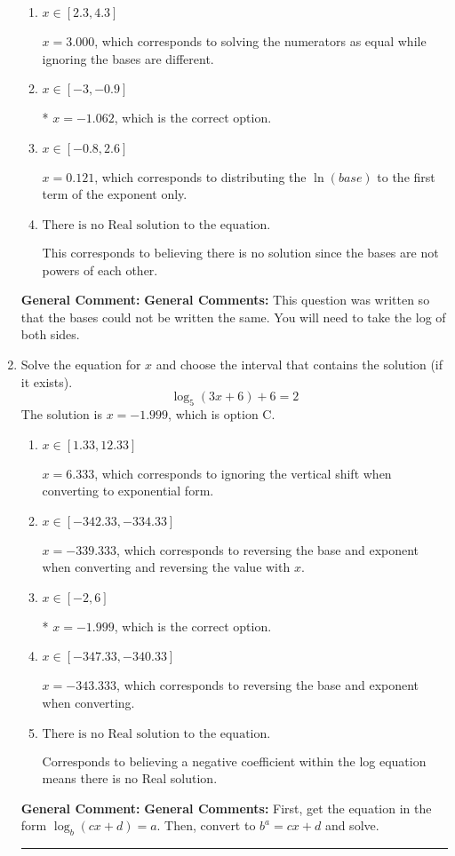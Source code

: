 \documentclass{extbook}[14pt]
\newcommand{\litem}[1]{\item #1

\rule{\textwidth}{0.4pt}}
\begin{document}
\begin{enumerate}
{\begin{enumerate}[label=\Alph*.]
$x = -26.339$, which corresponds to distributing the $\ln(base)$ to the second term of the exponent only.
\item \( x \in [2.3, 4.3] \)

$x = 3.000$, which corresponds to solving the numerators as equal while ignoring the bases are different.
\item \( x \in [-3, -0.9] \)

* $x = -1.062$, which is the correct option.
\item \( x \in [-0.8, 2.6] \)

$x = 0.121$, which corresponds to distributing the $\ln(base)$ to the first term of the exponent only.
\item \( \text{There is no Real solution to the equation.} \)

This corresponds to believing there is no solution since the bases are not powers of each other.
\end{enumerate}

\textbf{General Comment:} \textbf{General Comments:} This question was written so that the bases could not be written the same. You will need to take the log of both sides.
}
\litem{
Solve the equation for $x$ and choose the interval that contains the solution (if it exists).
\[ \log_{5}{(3x+6)}+6 = 2 \]The solution is \( x = -1.999 \), which is option C.\begin{enumerate}[label=\Alph*.]
\item \( x \in [1.33, 12.33] \)

$x = 6.333$, which corresponds to ignoring the vertical shift when converting to exponential form.
\item \( x \in [-342.33, -334.33] \)

$x = -339.333$, which corresponds to reversing the base and exponent when converting and reversing the value with $x$.
\item \( x \in [-2, 6] \)

* $x = -1.999$, which is the correct option.
\item \( x \in [-347.33, -340.33] \)

$x = -343.333$, which corresponds to reversing the base and exponent when converting.
\item \( \text{There is no Real solution to the equation.} \)

Corresponds to believing a negative coefficient within the log equation means there is no Real solution.
\end{enumerate}

\textbf{General Comment:} \textbf{General Comments:} First, get the equation in the form $\log_b{(cx+d)} = a$. Then, convert to $b^a = cx+d$ and solve.
}
\end{enumerate}
\end{document}
